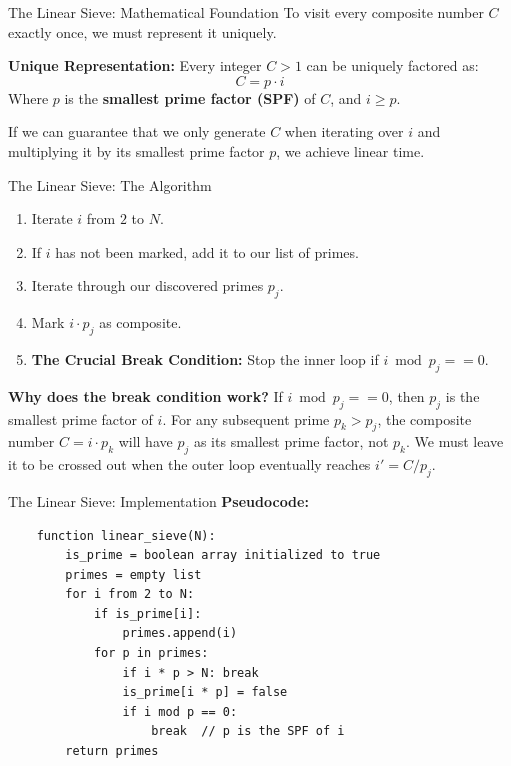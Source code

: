 \documentclass[aspectratio=169]{beamer}
\begin{document}
\begin{frame}{The Linear Sieve: Mathematical Foundation}
    To visit every composite number $C$ exactly once, we must represent it uniquely.
    
    \vspace{0.3cm}
    \textbf{Unique Representation:}
    Every integer $C > 1$ can be uniquely factored as:
    $$C = p \cdot i$$
    Where $p$ is the \textbf{smallest prime factor (SPF)} of $C$, and $i \ge p$.
    
    
    
    \vspace{0.3cm}
    If we can guarantee that we only generate $C$ when iterating over $i$ and multiplying it by its smallest prime factor $p$, we achieve linear time.
\end{frame}

\begin{frame}{The Linear Sieve: The Algorithm}
    \begin{enumerate}
        \item Iterate $i$ from $2$ to $N$.
        \item If $i$ has not been marked, add it to our list of primes.
        \item Iterate through our discovered primes $p_j$.
        \item Mark $i \cdot p_j$ as composite.
        \item \textbf{The Crucial Break Condition:} Stop the inner loop if $i \bmod p_j == 0$.
    \end{enumerate}
    
    \vspace{0.3cm}
    \textbf{Why does the break condition work?}
    If $i \bmod p_j == 0$, then $p_j$ is the smallest prime factor of $i$. For any subsequent prime $p_{k} > p_j$, the composite number $C = i \cdot p_k$ will have $p_j$ as its smallest prime factor, not $p_k$. We must leave it to be crossed out when the outer loop eventually reaches $i' = C / p_j$.
\end{frame}

\begin{frame}[fragile]{The Linear Sieve: Implementation}
    \textbf{Pseudocode:}
    \begin{verbatim}
    function linear_sieve(N):
        is_prime = boolean array initialized to true
        primes = empty list
        for i from 2 to N:
            if is_prime[i]:
                primes.append(i)
            for p in primes:
                if i * p > N: break
                is_prime[i * p] = false
                if i mod p == 0: 
                    break  // p is the SPF of i  
        return primes
    \end{verbatim}
\end{frame}
\end{document}
